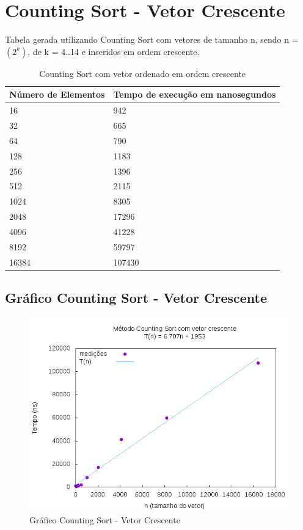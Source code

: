 \documentclass[12pt,a4paper,twoside]{report}
\begin{document}
\section{Counting Sort - Vetor Crescente}
Tabela gerada utilizando Counting Sort com vetores de tamanho n, sendo n = $(2^k)$, de k = 4..14 e inseridos em ordem crescente.
\begin{table}[H]
\centering
\caption{Counting Sort com vetor ordenado em ordem crescente}
\label{my-label}
\begin{tabular}{|l|l|}
\hline
\multicolumn{1}{|c|}{\textbf{Número de Elementos}} & \multicolumn{1}{c|}{\textbf{Tempo de execução em nanosegundos}} \\ \hline
16 & 942 \\ \hline
32 & 665 \\ \hline
64 & 790 \\ \hline
128 & 1183 \\ \hline
256 & 1396 \\ \hline
512 & 2115 \\ \hline
1024 & 8305 \\ \hline
2048 & 17296 \\ \hline
4096 & 41228 \\ \hline
8192 & 59797 \\ \hline
16384 & 107430 \\ \hline
\end{tabular}
\end{table}

\subsection{Gráfico Counting Sort - Vetor Crescente}
\begin{figure}[H]
    \centering
    \includegraphics[width=0.7\linewidth]{graficos/CountingSort/vIntCrescente/vIntCrescente.png}
  \caption{Gráfico Counting Sort - Vetor Crescente}
\end{figure}
\end{document}
